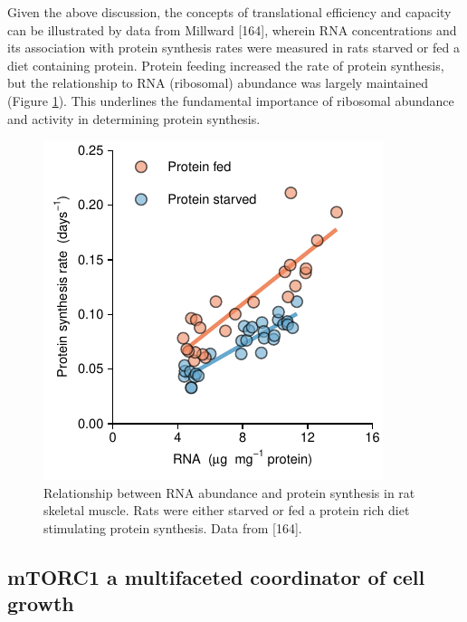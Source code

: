 \documentclass[twoside,10pt]{gihclass} %
\begin{document}
Given the above discussion, the concepts of translational efficiency and capacity can be illustrated by data from Millward
{[}164{]},
wherein RNA concentrations and its association with protein synthesis rates were measured in rats starved or fed a diet containing protein.
Protein feeding increased the rate of protein synthesis, but the relationship to RNA (ribosomal) abundance was largely maintained (Figure \ref{fig:Millward1973}). This underlines the fundamental importance of ribosomal abundance and activity in determining protein synthesis.


\begin{figure}

{\centering \includegraphics{thesis_files/figure-latex/Millward1973-1} 

}

\caption[Relationship between RNA content and protein synthesis in rat skeletal muscle, data from {[}164{]}]{Relationship between RNA abundance and protein synthesis in rat skeletal muscle. Rats were either starved or fed a protein rich diet stimulating protein synthesis. Data from {[}164{]}.}\label{fig:Millward1973}
\end{figure}
\hypertarget{mtorc1-a-multifaceted-coordinator-of-cell-growth}{%
\subsection{mTORC1 a multifaceted coordinator of cell growth}\label{mtorc1-a-multifaceted-coordinator-of-cell-growth}}
\end{document}

